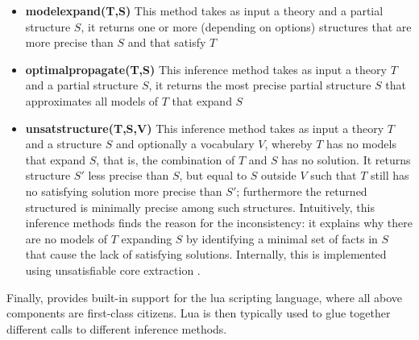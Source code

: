 \begin{itemize}
 \item \textbf{modelexpand(T,S)} This method takes as input a theory and a partial structure $S$, it returns one or more (depending on options) structures that are more precise than $S$ and that satisfy $T$
 \item \textbf{optimalpropagate(T,S)} This inference method takes as input a theory $T$ and a partial structure $S$, it returns the most precise partial structure $S$ that approximates all models of $T$ that expand $S$ 
 \item \textbf{unsatstructure(T,S,V)} This inference method takes as input a theory $T$ and a structure $S$ and optionally a vocabulary $V$, whereby $T$ has no models that expand $S$, that is, the combination of $T$ and $S$ has no solution. It returns structure $S'$ less precise than $S$, but equal to $S$ outside $V$ such that $T$ still has no satisfying solution more precise than $S'$; furthermore the returned structured is minimally precise among such structures. Intuitively, this inference methods finds the reason for the inconsistency: it explains why there are no models of $T$ expanding $S$ by identifying a minimal set of facts in $S$ that cause the lack of satisfying solutions. 
 Internally, this is implemented using unsatisfiable core extraction \cite{conf/sat/LynceM04}. 
\end{itemize}
Finally, \idp provides built-in support for the lua scripting language, where all above components are first-class citizens. Lua is then typically used to glue together different calls to different inference methods.

